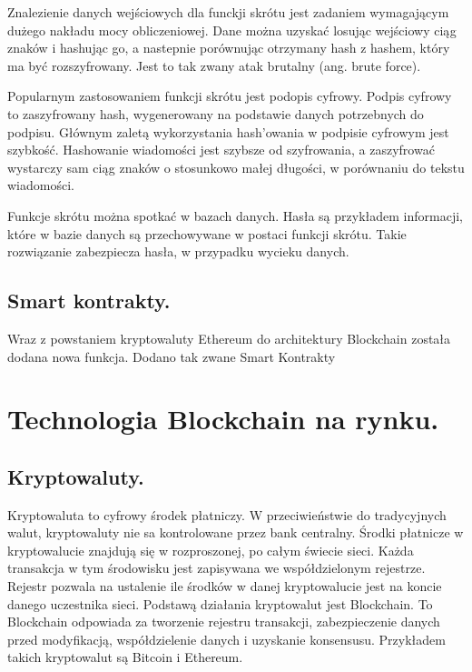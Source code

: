 \documentclass[a4paper,13pt]{report}
\begin{document}
Znalezienie danych wejściowych dla funckji skrótu jest zadaniem wymagającym dużego nakładu mocy obliczeniowej. Dane można uzyskać losując wejściowy ciąg znaków i hashując go, a nastepnie porównując otrzymany hash z hashem, który ma być rozszyfrowany. Jest to tak zwany atak brutalny (ang. brute force).

Popularnym zastosowaniem funkcji skrótu jest podopis cyfrowy. Podpis cyfrowy to zaszyfrowany hash, wygenerowany na podstawie danych potrzebnych do podpisu. Głównym zaletą wykorzystania hash'owania w podpisie cyfrowym jest szybkość. Hashowanie wiadomości jest szybsze od szyfrowania, a zaszyfrować wystarczy sam ciąg znaków o stosunkowo małej długości, w porównaniu do tekstu wiadomości.

Funkcje skrótu można spotkać w bazach danych. Hasła są przykładem informacji, które w bazie danych są przechowywane w postaci funkcji skrótu. Takie rozwiązanie zabezpiecza hasła, w przypadku wycieku danych.

\subsection{Smart kontrakty.}

Wraz z powstaniem kryptowaluty Ethereum do architektury Blockchain została dodana nowa funkcja. Dodano tak zwane Smart Kontrakty

\newpage

\section{Technologia Blockchain na rynku.}

\subsection{Kryptowaluty.}

Kryptowaluta to cyfrowy środek płatniczy. W przeciwieństwie do tradycyjnych walut, kryptowaluty nie sa kontrolowane przez bank centralny. Środki płatnicze w kryptowalucie znajdują się w rozproszonej, po całym świecie sieci. Każda transakcja w tym środowisku jest zapisywana we współdzielonym rejestrze. Rejestr pozwala na ustalenie ile środków w danej kryptowalucie jest na koncie danego uczestnika sieci. Podstawą działania kryptowalut jest Blockchain. To Blockchain odpowiada za tworzenie rejestru transakcji, zabezpieczenie danych przed modyfikacją, współdzielenie danych i uzyskanie konsensusu. Przykładem takich kryptowalut są Bitcoin i Ethereum.
\end{document}
